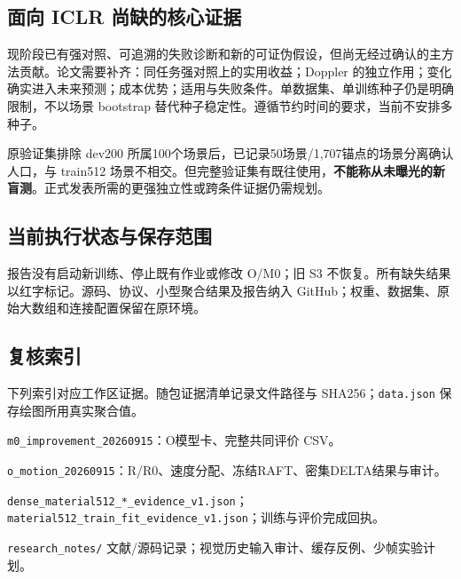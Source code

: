 \documentclass[UTF8,a4paper,11pt,fontset=none]{ctexart}
\newcommand{\pending}[1]{\textcolor{pendingred}{#1}}
\begin{document}
\subsection{面向 ICLR 尚缺的核心证据}
现阶段已有强对照、可追溯的失败诊断和新的可证伪假设，但\pending{尚无经过确认的主方法贡献}。论文需要补齐：同任务强对照上的实用收益；Doppler 的独立作用；变化确实进入未来预测；成本优势；适用与失败条件。单数据集、单训练种子仍是明确限制，不以场景 bootstrap 替代种子稳定性。遵循节约时间的要求，当前不安排多种子。

原验证集排除 dev200 所属100个场景后，已记录50场景/1,707锚点的场景分离确认人口，与 train512 场景不相交。但完整验证集有既往使用，\textbf{不能称从未曝光的新盲测}。正式发表所需的更强独立性或跨条件证据仍需规划。

\subsection{当前执行状态与保存范围}
\StatusParagraph
报告没有启动新训练、停止既有作业或修改 O/M0；旧 S3 不恢复。所有缺失结果以红字标记。源码、协议、小型聚合结果及报告纳入 GitHub；权重、数据集、原始大数组和连接配置保留在原环境。

\subsection{复核索引}
下列索引对应工作区证据。随包证据清单记录文件路径与 SHA256；\texttt{data.json} 保存绘图所用真实聚合值。
\begin{description}[style=nextline,font=\bfseries\small,itemsep=1pt]
\item[E1] \small \texttt{m0\_improvement\_20260915}：O模型卡、完整共同评价 CSV。
\item[E2--E4] \small \texttt{o\_motion\_20260915}：R/R0、速度分配、冻结RAFT、密集DELTA结果与审计。
\item[E5--E6] \small \texttt{dense\_material512\_*\_evidence\_v1.json}；\texttt{material512\_train\_fit\_evidence\_v1.json}；训练与评价完成回执。
\item[E7--E8] \small \texttt{research\_notes/} 文献/源码记录；视觉历史输入审计、缓存反例、少帧实验计划。
\end{description}

\clearpage
\end{document}
